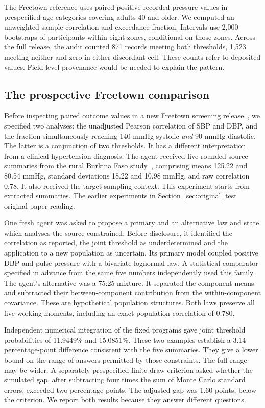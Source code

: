 The Freetown reference uses paired positive recorded pressure values in prespecified age categories covering adults 40 and older. We computed an unweighted sample correlation and exceedance fraction. Intervals use 2,000 bootstraps of participants within eight zones, conditional on those zones. Across the full release, the audit counted 871 records meeting both thresholds, 1,523 meeting neither and zero in either discordant cell. These counts refer to deposited values. Field-level provenance would be needed to explain the pattern.



\subsection{The prospective Freetown comparison}
Before inspecting paired outcome values in a new Freetown screening release~\cite{freetown,freetowndata}, we specified two analyses: the unadjusted Pearson correlation of SBP and DBP, and the fraction simultaneously reaching 140 mmHg systolic \emph{and} 90 mmHg diastolic. The latter is a conjunction of two thresholds. It has a different interpretation from a clinical hypertension diagnosis. The agent received five rounded source summaries from the rural Burkina Faso study~\cite{jaspert}, comprising means 125.22 and 80.54 mmHg, standard deviations 18.22 and 10.98 mmHg, and raw correlation 0.78. It also received the target sampling context. This experiment starts from extracted summaries. The earlier experiments in Section~\ref{sec:original} test original-paper reading.


One fresh agent was asked to propose a primary and an alternative law and state which analyses the source constrained. Before disclosure, it identified the correlation as reported, the joint threshold as underdetermined and the application to a new population as uncertain. Its primary model coupled positive DBP and pulse pressure with a bivariate lognormal law. A statistical comparator specified in advance from the same five numbers independently used this family. The agent's alternative was a 75:25 mixture. It separated the component means and subtracted their between-component contribution from the within-component covariance. These are hypothetical population structures. Both laws preserve all five working moments, including an exact population correlation of 0.780.

Independent numerical integration of the fixed programs gave joint threshold probabilities of 11.9449\% and 15.0851\%. These two examples establish a 3.14 percentage-point difference consistent with the five summaries. They give a lower bound on the range of answers permitted by those constraints. The full range may be wider. A separately prespecified finite-draw criterion asked whether the simulated gap, after subtracting four times the sum of Monte Carlo standard errors, exceeded two percentage points. The adjusted gap was 1.60 points, below the criterion. We report both results because they answer different questions.

